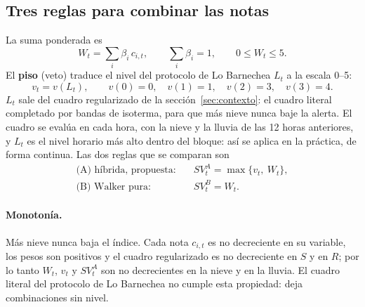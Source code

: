 \subsection{Tres reglas para combinar las notas}


La suma ponderada es
\begin{equation}
W_t = \sum_{i} \beta_i\, c_{i,t}, \qquad \sum_i \beta_i = 1, \qquad 0 \le W_t \le 5 .
\end{equation}
El \textbf{piso} (veto) traduce el nivel del protocolo de Lo Barnechea $L_t$ a la escala 0--5:
\begin{equation}
v_t = v(L_t), \qquad v(0)=0,\quad v(1)=1,\quad v(2)=3,\quad v(3)=4 .
\end{equation}
$L_t$ sale del cuadro regularizado de la sección~\ref{sec:contexto}: el cuadro literal completado por bandas de isoterma, para que más nieve nunca baje la alerta. El cuadro se evalúa en cada hora, con la nieve y la lluvia de las 12 horas anteriores, y $L_t$ es el nivel horario más alto dentro del bloque: así se aplica en la práctica, de forma continua. Las dos reglas que se comparan son
\begin{align}
\text{(A) híbrida, propuesta:}\quad & SV^{A}_t = \max\{v_t,\ W_t\}, \label{eq:svA}\\
\text{(B) Walker pura:}\quad & SV^{B}_t = W_t . \label{eq:svB}
\end{align}

\paragraph{Monotonía.} Más nieve nunca baja el índice. Cada nota $c_{i,t}$ es no decreciente en su variable, los pesos son positivos y el cuadro regularizado es no decreciente en $S$ y en $R$; por lo tanto $W_t$, $v_t$ y $SV^A_t$ son no decrecientes en la nieve y en la lluvia. El cuadro literal del protocolo de Lo Barnechea no cumple esta propiedad: deja combinaciones sin nivel.


